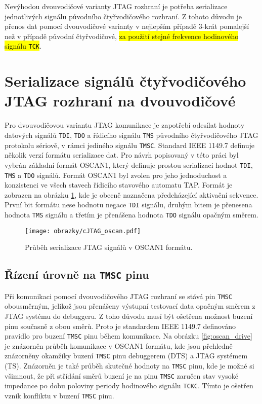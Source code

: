 Nevýhodou dvouvodičové varianty \acs{JTAG} rozhraní je potřeba serializace jednotlivých signálu původního čtyřvodičového rozhraní. Z tohoto důvodu je přenos dat pomocí dvouvodičové varianty v nejlepším případě 3-krát pomalejší než v případě původní čtyřvodičové, \hl{za použití stejné frekvence hodinového signálu \texttt{{\acs{TCK}}}}. \cite{IEEE_1149-7}

\section{Serializace signálů čtyřvodičového \acs{JTAG} rozhraní na dvouvodičové}	\label{sec:oscan1} 
Pro dvouvodičovou variantu \acs{JTAG} komunikace je zapotřebí odesílat hodnoty datových signálů {\texttt{\acs{TDI}}}, {\texttt{\acs{TDO}}} a řídicího signálu \texttt{\acs{TMS}} původního čtyřvodičového \acs{JTAG} protokolu sériově, v rámci jediného signálu \texttt{\acs{TMSC}}. Standard IEEE 1149.7 definuje několik verzí formátu serializace dat. Pro návrh popisovaný v této práci byl vybrán základní formát OSCAN1, který definuje prostou serializaci hodnot \texttt{\acs{TDI}}, \texttt{\acs{TMS}} a \texttt{\acs{TDO}} signálů. Formát OSCAN1 byl zvolen pro jeho jednoduchost a konzistenci ve všech stavech řídicího stavového automatu \acs{TAP}. Formát je zobrazen na obrázku \ref{fig:oscan}, kde je obecně naznačena předcházející aktivační sekvence. První bit formátu nese hodnotu negace \texttt{\acs{TDI}} signálu, druhým bitem je přenesena hodnota \texttt{\acs{TMS}} signálu a třetím je přenášena hodnota \texttt{\acs{TDO}} signálu opačným směrem. \cite{IEEE_1149-7}

\begin{figure}[!h]
  \begin{center}
    \texttt{[image: obrazky/cJTAG\_oscan.pdf]}
  \end{center}
  \caption{Průběh serializace \acs{JTAG} signálů v OSCAN1 formátu.}
	\label{fig:oscan}
\end{figure}
    
\subsection{Řízení úrovně na \texttt{\acs{TMSC}} pinu}	\label{subsec:oscan1_drive} 
Při komunikaci pomocí dvouvodičového \acs{JTAG} rozhraní se stává pin \texttt{\acs{TMSC}} obousměrným, jelikož jsou přenášeny výstupní testovací data opačným směrem z \acs{JTAG} systému do debuggeru. Z toho důvodu musí být ošetřena možnost buzení pinu současně z obou směrů. Proto je standardem IEEE 1149.7 definováno pravidlo pro buzení \texttt{\acs{TMSC}} pinu během komunikace. Na obrázku \ref{fig:oscan_drive} je znázorněn průběh komunikace v OSCAN1 formátu, kde jsou přehledně znázorněny okamžiky buzení \texttt{\acs{TMSC}} pinu debuggerem (\acs{DTS}) a \acs{JTAG} systémem (\acs{TS}). Znázorněn je také průběh skutečné hodnoty na \texttt{\acs{TMSC}} pinu, kde je možné si všimnout, že při střídání směrů buzení je na pinu \texttt{\acs{TMSC}} zaručen stav vysoké impedance po dobu poloviny periody hodinového signálu \texttt{\acs{TCKC}}. Tímto je ošetřen vznik konfliktu v buzení \texttt{\acs{TMSC}} pinu. \cite{IEEE_1149-7}

